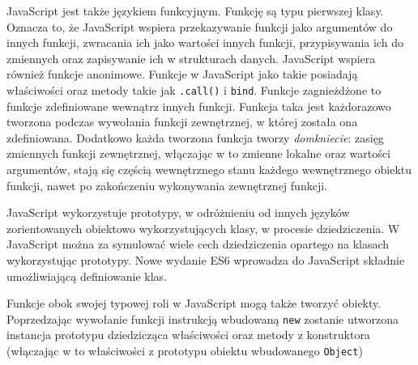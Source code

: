 JavaScript jest także językiem funkcyjnym. Funkcję są typu pierwszej klasy. Oznacza to, że JavaScript wspiera przekazywanie funkcji jako argumentów do innych funkcji, zwracania ich jako wartości innych funkcji, przypisywania ich do zmiennych oraz zapisywanie ich w strukturach danych. JavaScript wspiera również funkcje anonimowe\cite{fcfunctionWiki}. Funkcje w JavaScript jako takie posiadają właściwości oraz metody takie jak \verb|.call()| i \verb|bind|. Funkcje zagnieżdżone to funkcje zdefiniowane wewnątrz innych funkcji. Funkcja taka jest każdorazowo tworzona podczas wywołania funkcji zewnętrznej, w której została ona zdefiniowana. Dodatkowo każda tworzona funkcja tworzy \emph{domkniecie}: zasięg zmiennych funkcji zewnętrznej, włączając w to zmienne lokalne oraz wartości argumentów, stają się częścią wewnętrznego stanu każdego wewnętrznego obiektu funkcji, nawet po zakończeniu wykonywania zewnętrznej funkcji\cite{jsWiki}.

JavaScript wykorzystuje prototypy, w odróżnieniu od innych języków zorientowanych obiektowo wykorzystujących klasy, w procesie dziedziczenia. W JavaScript można za symulować wiele cech dziedziczenia opartego na klasach wykorzystując prototypy\cite{jsWiki}. Nowe wydanie ES6 wprowadza do JavaScript składnie umożliwiającą definiowanie klas.  

Funkcje obok swojej typowej roli w JavaScript mogą także tworzyć obiekty. Poprzedzając wywołanie funkcji instrukcją wbudowaną \verb|new| zostanie utworzona instancja prototypu dziedzicząca właściwości oraz metody z konstruktora (włączając w to właściwości z prototypu obiektu wbudowanego \verb|Object|)